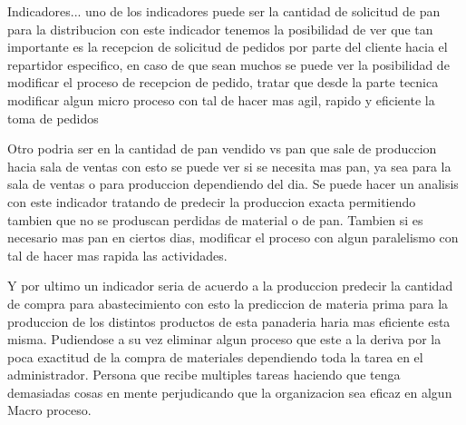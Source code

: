 Indicadores...
uno de los indicadores puede ser la cantidad de solicitud de pan para la distribucion
con este indicador tenemos la posibilidad de ver que tan importante es la recepcion
de solicitud de pedidos por parte del cliente hacia el repartidor especifico, en caso de que sean muchos
se puede ver la posibilidad de modificar el proceso de recepcion de pedido, tratar que desde la parte tecnica
modificar algun micro proceso con tal de hacer mas agil, rapido y eficiente la toma de pedidos

Otro podria ser en la cantidad de pan vendido vs pan que sale de produccion hacia sala de ventas
con esto se puede ver si se necesita mas pan, ya sea para la sala de ventas o para produccion dependiendo
del dia. Se puede hacer un analisis con este indicador tratando de predecir la produccion exacta permitiendo
tambien que no se produscan perdidas de material o de pan. Tambien si es necesario mas pan en ciertos dias,
modificar el proceso con algun paralelismo con tal de hacer mas rapida las actividades.

Y por ultimo un indicador seria de acuerdo a la produccion predecir la cantidad de compra para abastecimiento
con esto la prediccion de materia prima para la produccion de los distintos productos de esta panaderia haria mas 
eficiente esta misma. Pudiendose a su vez eliminar algun proceso que este a la deriva por la poca exactitud 
de la compra de materiales dependiendo toda la tarea en el administrador. Persona que recibe multiples tareas
haciendo que tenga demasiadas cosas en mente perjudicando que la organizacion sea eficaz en algun Macro proceso.
